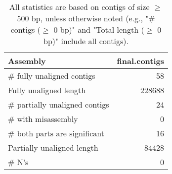 \documentclass[12pt,a4paper]{article}
\begin{document}
\begin{table}[ht]
\begin{center}
\caption{All statistics are based on contigs of size $\geq$ 500 bp, unless otherwise noted (e.g., "\# contigs ($\geq$ 0 bp)" and "Total length ($\geq$ 0 bp)" include all contigs).}
\begin{tabular}{|l*{1}{|r}|}
\hline
Assembly & final.contigs \\ \hline
\# fully unaligned contigs & 58 \\ \hline
Fully unaligned length & 228688 \\ \hline
\# partially unaligned contigs & 24 \\ \hline
\hspace{5mm}\# with misassembly & 0 \\ \hline
\hspace{5mm}\# both parts are significant & 16 \\ \hline
Partially unaligned length & 84428 \\ \hline
\# N's & 0 \\ \hline
\end{tabular}
\end{center}
\end{table}
\end{document}
